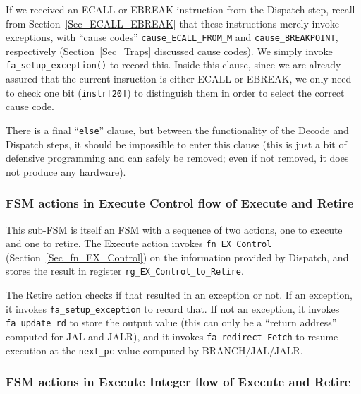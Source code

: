If we received an ECALL or EBREAK instruction from the Dispatch step,
recall from Section~\ref{Sec_ECALL_EBREAK} that these instructions
merely invoke exceptions, with ``cause codes''
\verb|cause_ECALL_FROM_M| and \verb|cause_BREAKPOINT|, respectively
(Section~\ref{Sec_Traps} discussed cause codes).  We simply invoke
\verb|fa_setup_exception()| to record this.  Inside this clause, since
we are already assured that the current insruction is either ECALL or
EBREAK, we only need to check one bit (\verb|instr[20]|) to
distinguish them in order to select the correct cause code.

There is a final ``\verb|else|'' clause, but between the functionality
of the Decode and Dispatch steps, it should be impossible to enter
this clause (this is just a bit of defensive programming and can
safely be removed; even if not removed, it does not produce any
hardware).


\subsubsection{FSM actions in Execute Control flow of Execute and Retire}



This sub-FSM is itself an FSM with a sequence of two actions, one to
execute and one to retire.  The Execute action invokes
\verb|fn_EX_Control| (Section~\ref{Sec_fn_EX_Control}) on the
information provided by Dispatch, and stores the result in register
\verb|rg_EX_Control_to_Retire|.

The Retire action checks if that resulted in an exception or not. If
an exception, it invokes \verb|fa_setup_exception| to record that.  If
not an exception, it invokes \verb|fa_update_rd| to store the output
value (this can only be a ``return address'' computed for JAL and
JALR), and it invokes \verb|fa_redirect_Fetch| to resume execution at
the \verb|next_pc| value computed by BRANCH/JAL/JALR.


\subsubsection{FSM actions in Execute Integer flow of Execute and Retire}



